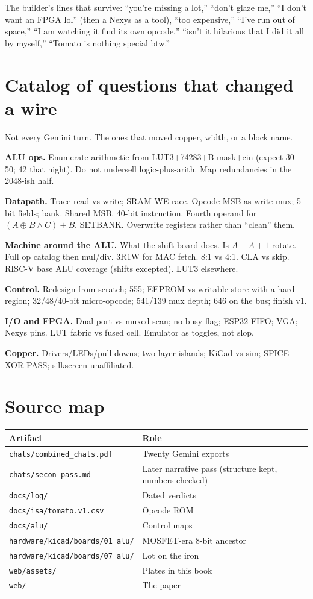 \documentclass[11pt,openany]{book}
\begin{document}
The builder's lines that survive: ``you're missing a lot,'' ``don't glaze me,'' ``I don't want an FPGA lol'' (then a Nexys as a tool), ``too expensive,'' ``I've run out of space,'' ``I am watching it find its own opcode,'' ``isn't it hilarious that I did it all by myself,'' ``Tomato is nothing special btw.''

\chapter{Catalog of questions that changed a wire}

Not every Gemini turn. The ones that moved copper, width, or a block name.

\textbf{ALU ops.} Enumerate arithmetic from LUT3$+$74283$+$B-mask$+$cin (expect 30--50; 42 that night). Do not undersell logic-plus-arith. Map redundancies in the 2048-ish half.

\textbf{Datapath.} Trace read vs write; SRAM WE race. Opcode MSB as write mux; 5-bit fields; bank. Shared MSB. 40-bit instruction. Fourth operand for $(A\oplus B\wedge C)+B$. SETBANK. Overwrite registers rather than ``clean'' them.

\textbf{Machine around the ALU.} What the shift board does. Is $A{+}A{+}1$ rotate. Full op catalog then mul/div. 3R1W for MAC fetch. 8:1 vs 4:1. CLA vs skip. RISC-V base ALU coverage (shifts excepted). LUT3 elsewhere.

\textbf{Control.} Redesign from scratch; 555; EEPROM vs writable store with a hard region; 32/48/40-bit micro-opcode; 541/139 mux depth; 646 on the bus; finish v1.

\textbf{I/O and FPGA.} Dual-port vs muxed scan; no busy flag; ESP32 FIFO; VGA; Nexys pins. LUT fabric vs fused cell. Emulator as toggles, not slop.

\textbf{Copper.} Drivers/LEDs/pull-downs; two-layer islands; KiCad vs sim; SPICE XOR PASS; silkscreen unaffiliated.

\appendix
\chapter{Source map}

\begin{tabular}{@{}p{5.4cm}p{9.2cm}@{}}
\toprule
Artifact & Role \\
\midrule
\texttt{chats/combined\_chats.pdf} & Twenty Gemini exports \\
\texttt{chats/secon-pass.md} & Later narrative pass (structure kept, numbers checked) \\
\texttt{docs/log/} & Dated verdicts \\
\texttt{docs/isa/tomato.v1.csv} & Opcode ROM \\
\texttt{docs/alu/} & Control maps \\
\texttt{hardware/kicad/boards/01\_alu/} & MOSFET-era 8-bit ancestor \\
\texttt{hardware/kicad/boards/07\_alu/} & Lot on the iron \\
\texttt{web/assets/} & Plates in this book \\
\texttt{web/} & The paper \\
\bottomrule
\end{tabular}
\end{document}
